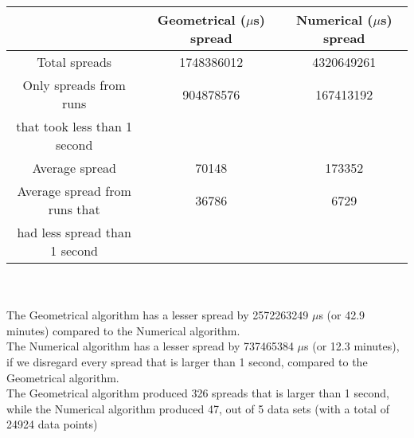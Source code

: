 \begin{tabular}[3]{c|c|c}
 & Geometrical ($\mu$s) spread & Numerical ($\mu$s) spread\\
\hline
Total spreads & 1748386012 & 4320649261 \\ 
\hline 
Only spreads from runs & 904878576 & 167413192 \\ 
that took less than 1 second & & \\ 
\hline
Average spread & 70148 & 173352 \\
\hline
Average spread from runs that & 36786 & 6729 \\ 
had less spread than 1 second & & \\ 
\end{tabular}\\ \\
The Geometrical algorithm has a lesser spread by 2572263249 $\mu$s (or 42.9 minutes) compared to the Numerical algorithm.\\
The Numerical algorithm has a lesser spread by 737465384 $\mu$s (or 12.3 minutes), if we disregard every spread that is larger than 1 second, compared to the Geometrical algorithm.\\
The Geometrical algorithm produced 326 spreads that is larger than 1 second, while the Numerical algorithm produced 47, out of 5 data sets (with a total of 24924 data points)\\

